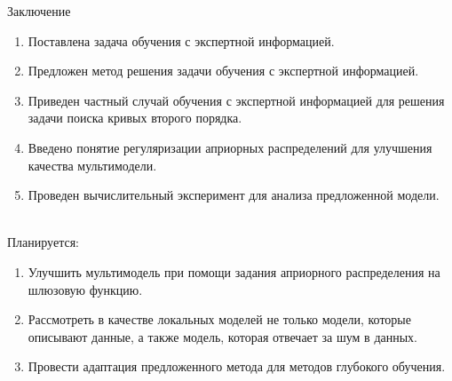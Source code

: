 \documentclass[10pt,pdf,hyperref={unicode}]{beamer}
\begin{document}
\begin{frame}{Заключение}
\justifying
	\begin{enumerate}
	\justifying
		\item Поставлена задача обучения с экспертной информацией.
		\item Предложен метод решения задачи обучения с экспертной информацией.
		\item Приведен частный случай обучения с экспертной информацией для решения задачи поиска кривых второго порядка.
		\item Введено понятие регуляризации априорных распределений для улучшения качества мультимодели.
		\item Проведен вычислительный эксперимент для анализа предложенной модели.
	\end{enumerate}

~\\

Планируется:
	\begin{enumerate}
	\justifying
		\item Улучшить мультимодель при помощи задания априорного распределения на шлюзовую функцию.
		\item Рассмотреть в качестве локальных моделей не только модели, которые описывают данные, а также модель, которая отвечает за шум в данных.
		\item Провести адаптация предложенного метода для методов глубокого обучения.
	\end{enumerate}	

\end{frame}
\end{document}
